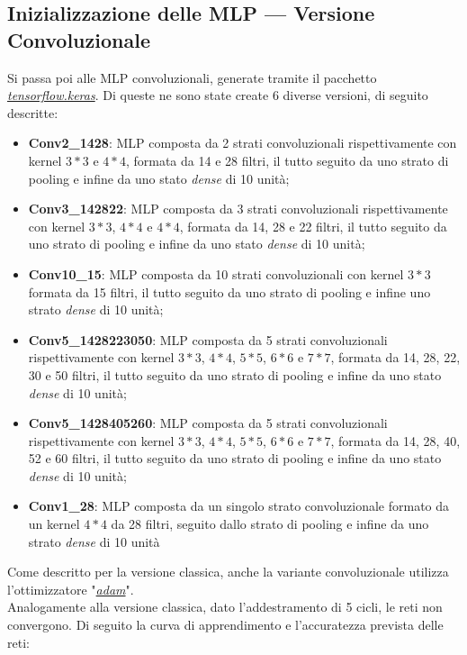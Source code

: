 \documentclass[12pt, a4paper]{article}
\begin{document}
\subsection{Inizializzazione delle MLP --- Versione Convoluzionale}
Si passa poi alle MLP convoluzionali, generate tramite il pacchetto \href{https://www.tensorflow.org/api_docs/python/tf/keras/Model}{\textit{tensorflow.keras}}. Di queste ne sono state create 6 diverse versioni, di seguito descritte:
\begin{itemize}
    \item \textbf{Conv2\_1428}: MLP composta da 2 strati convoluzionali rispettivamente con kernel \(3*3\) e \(4*4\), formata da 14 e 28 filtri, il tutto seguito da uno strato di pooling e infine da uno stato \textit{dense} di 10 unità;
    \item \textbf{Conv3\_142822}: MLP composta da 3 strati convoluzionali rispettivamente con kernel \(3*3\), \(4*4\) e \(4*4\), formata da 14, 28 e 22 filtri, il tutto seguito da uno strato di pooling e infine da uno stato \textit{dense} di 10 unità;
    \item \textbf{Conv10\_15}: MLP composta da 10 strati convoluzionali con kernel \(3*3\) formata da 15 filtri, il tutto seguito da uno strato di pooling e infine uno strato \textit{dense} di 10 unità; 
    \item \textbf{Conv5\_1428223050}: MLP composta da 5 strati convoluzionali rispettivamente con kernel \(3*3\), \(4*4\), \(5*5\), \(6*6\) e \(7*7\), formata da 14, 28, 22, 30 e 50 filtri, il tutto seguito da uno strato di pooling e infine da uno stato \textit{dense} di 10 unità;
    \item \textbf{Conv5\_1428405260}: MLP composta da 5 strati convoluzionali rispettivamente con kernel \(3*3\), \(4*4\), \(5*5\), \(6*6\) e \(7*7\), formata da 14, 28, 40, 52 e 60 filtri, il tutto seguito da uno strato di pooling e infine da uno stato \textit{dense} di 10 unità;
    \item \textbf{Conv1\_28}: MLP composta da un singolo strato convoluzionale formato da un kernel \(4*4\) da 28 filtri, seguito dallo strato di pooling e infine da uno strato \textit{dense} di 10 unità
\end{itemize}
Come descritto per la versione classica, anche la variante convoluzionale utilizza l'ottimizzatore "\href{https://arxiv.org/abs/1412.6980}{\textit{adam}}".\\
Analogamente alla versione classica, dato l'addestramento di 5 cicli, le reti non convergono. Di seguito la curva di apprendimento e l'accuratezza prevista delle reti:
\end{document}
